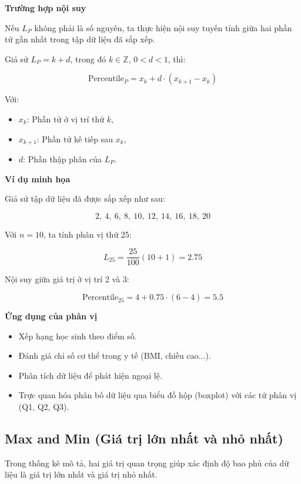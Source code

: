 \textbf{Trường hợp nội suy}

Nếu \( L_P \) không phải là số nguyên, ta thực hiện nội suy tuyến tính giữa hai phần tử gần nhất trong tập dữ liệu đã sắp xếp.

Giả sử \( L_P = k + d \), trong đó \( k \in \mathbb{Z} \), \( 0 < d < 1 \), thì:

\begin{equation}
    \label{eq:percentile-position-2}
    \text{Percentile}_P = x_k + d \cdot (x_{k+1} - x_k)
\end{equation}

\noindent
Với:
\begin{itemize}
    \item \( x_k \): Phần tử ở vị trí thứ \( k \),
    \item \( x_{k+1} \): Phần tử kế tiếp sau \( x_k \),
    \item \( d \): Phần thập phân của \( L_P \).
\end{itemize}

\textbf{Ví dụ minh họa}

Giả sử tập dữ liệu đã được sắp xếp như sau:

\[
    2,\ 4,\ 6,\ 8,\ 10,\ 12,\ 14,\ 16,\ 18,\ 20
\]

\noindent
Với \( n = 10 \), ta tính phân vị thứ 25:

\[
    L_{25} = \frac{25}{100}(10 + 1) = 2.75
\]

Nội suy giữa giá trị ở vị trí 2 và 3:

\[
    \text{Percentile}_{25} = 4 + 0.75 \cdot (6 - 4) = 5.5
\]

\textbf{Ứng dụng của phân vị}

\begin{itemize}
    \item Xếp hạng học sinh theo điểm số.
    \item Đánh giá chỉ số cơ thể trong y tế (BMI, chiều cao...).
    \item Phân tích dữ liệu để phát hiện ngoại lệ.
    \item Trực quan hóa phân bố dữ liệu qua biểu đồ hộp (boxplot) với các tứ phân vị (Q1, Q2, Q3).
\end{itemize}

\subsection {Max and Min (Giá trị lớn nhất và nhỏ nhất)}
\label{stat:minmax}

Trong thống kê mô tả, hai giá trị quan trọng giúp xác định độ bao phủ của dữ liệu là giá trị lớn nhất và giá trị nhỏ nhất.

